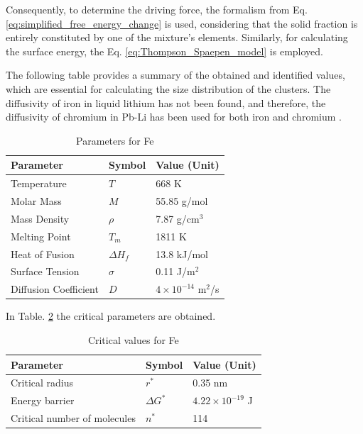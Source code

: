 Consequently, to determine the driving force, the formalism from Eq. \ref{eq:simplified_free_energy_change} is used, considering that the solid fraction is 
entirely constituted by one of the mixture's elements. Similarly, for calculating the surface energy, the Eq. \ref{eq:Thompson_Spaepen_model} is employed.

The following table provides a summary of the obtained and identified values, which are essential for calculating the size distribution of the clusters. 
The diffusivity of iron in liquid lithium has not been found, and therefore, the diffusivity of chromium in Pb-Li has been used for both iron and chromium \cite{KHANCHYCH2023101527}.
\begin{table}[h]
    \centering
    \begin{tabular}{|l|l|l|}
    \hline
    \textbf{Parameter} & \textbf{Symbol} & \textbf{Value (Unit)} \\ \hline
    Temperature        & $T$             & 668 K                 \\ \hline
    Molar Mass         & $M$             & 55.85 g/mol         \\ \hline
    Mass Density       & $\rho$          & 7.87 g/cm$^3$         \\ \hline
    Melting Point      & $T_m$           & 1811 K                \\ \hline
    Heat of Fusion     & $\Delta H_f$    & 13.8 kJ/mol           \\ \hline
    Surface Tension    & $\sigma$        & 0.11 J/m$^2$          \\ \hline
	Diffusion Coefficient & $D$          & $4 \times 10^{-14}$ m$^2$/s \\ \hline
    \end{tabular}
    \caption{Parameters for Fe}
    \label{tab:params_Fe}
\end{table}

In Table. \ref{tab:critical_fe} the critical parameters are obtained.
\begin{table}[h]
	\centering
	\begin{tabular}{|l|l|l|}
	\hline
	\textbf{Parameter} & \textbf{Symbol} & \textbf{Value (Unit)} \\ \hline
	Critical radius        & $r^*$             & 0.35 nm                 \\ \hline
	Energy barrier         & $\Delta G^*$             & $4.22 \times 10^{-19}$ J         \\ \hline
	Critical number of molecules       & $n^*$          & 114         \\ \hline
	\end{tabular}
	\caption{Critical values for Fe}
	\label{tab:critical_fe}
\end{table}

